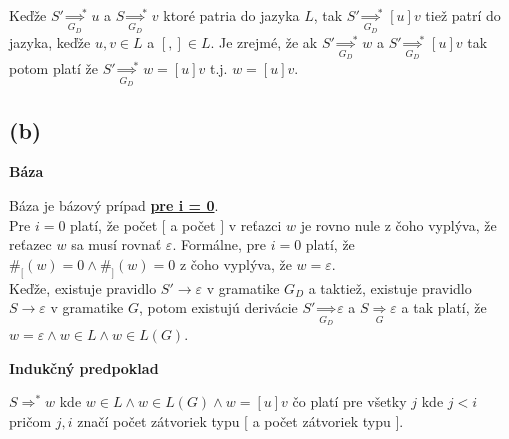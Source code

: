 \documentclass[11pt,a4paper]{article}
\begin{document}
Keďže $S' {\underset{G_D}{\Rightarrow}}^* u$ a $S {\underset{G_D}{\Rightarrow}}^* v$ ktoré patria do jazyka $L$, tak $S' {\underset{G_D}{\Rightarrow}}^* [u]v$ tiež patrí do jazyka, keďže $u, v \in L$ a $[,] \in L$. Je zrejmé, že ak $S' {\underset{G_D}{\Rightarrow}}^* w$ a $S' {\underset{G_D}{\Rightarrow}}^* [u]v$ tak potom platí že $S' {\underset{G_D}{\Rightarrow}}^* w = [u]v$ t.j. $w = [u]v$.

\subsection{(b)}

\textbf{Báza}
\begin{flushright}
\begin{minipage}{0.95\textwidth}
    Báza je bázový prípad \underline{\textbf{pre i = 0}}.\\

    Pre $i=0$ platí, že počet $[$ a počet $]$ v reťazci $w$ je rovno nule z čoho vyplýva, že reťazec $w$ sa musí rovnať $\varepsilon$. Formálne, pre $i=0$ platí, že $\#_{[}(w) = 0 \wedge \#_{]}(w) = 0$ z čoho vyplýva, že $w = \varepsilon$.\\

    Keďže, existuje pravidlo $S' \rightarrow \varepsilon$ v gramatike $G_D$ a taktiež, existuje pravidlo $S \rightarrow \varepsilon$ v gramatike $G$, potom existujú derivácie $S' \underset{G_D}{\Rightarrow} \varepsilon$ a $S \underset{G}{\Rightarrow} \varepsilon$ a tak platí, že $w = \varepsilon \wedge w \in L \wedge w \in L(G)$.
\end{minipage}
\end{flushright}

\textbf{Indukčný predpoklad}
\begin{flushright}
\begin{minipage}{0.95\textwidth}
    $S \Rightarrow^{*} w$ kde $w \in L \wedge w \in L(G) \wedge w = [u]v$ čo platí pre všetky $j$ kde $j < i$ pričom $j, i$ značí počet zátvoriek typu $[$ a počet zátvoriek typu $]$.
\end{minipage}
\end{flushright}
\end{document}
